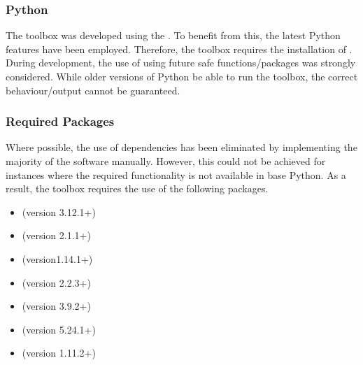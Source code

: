 \documentclass[letterpaper,10pt,english]{sphinxmanual}
\begin{document}
\subsubsection{Python}
\label{\detokenize{usage/requirements:python}}
\sphinxAtStartPar
The toolbox was developed using the .
To benefit from this, the latest Python features have been employed. Therefore, the toolbox requires the installation
of . During development, the use of using future safe functions/packages was strongly
considered. While older versions of Python  be able to run the toolbox, the correct behaviour/output cannot
be guaranteed.


\subsubsection{Required Packages}
\label{\detokenize{usage/requirements:required-packages}}
\sphinxAtStartPar
Where possible, the use of dependencies has been eliminated by implementing the majority of the software manually.
However, this could not be achieved for instances where the required functionality is not available in base Python.
As a result, the toolbox requires the use of the following packages.
\begin{itemize}
\item {} 
\sphinxAtStartPar
{} (version 3.12.1+)

\item {} 
\sphinxAtStartPar
{} (version 2.1.1+)

\item {} 
\sphinxAtStartPar
{} (version1.14.1+)

\item {} 
\sphinxAtStartPar
{} (version 2.2.3+)

\item {} 
\sphinxAtStartPar
{} (version 3.9.2+)

\item {} 
\sphinxAtStartPar
{} (version 5.24.1+)

\item {} 
\sphinxAtStartPar
{} (version 1.11.2+)

\end{itemize}
\end{document}
